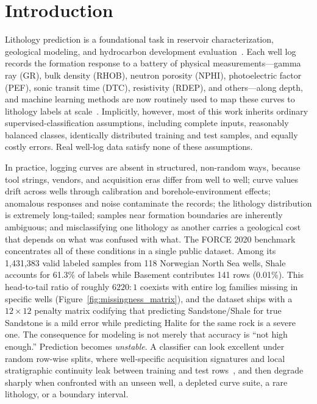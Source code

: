 \documentclass[bdcc,article,submit,pdftex,moreauthors]{Definitions/mdpi}
\begin{document}
\sloppy

\section{Introduction}
\label{sec:intro}
Lithology prediction is a foundational task in reservoir characterization, geological
modeling, and hydrocarbon development evaluation~\cite{rider2011,ellis2007,doveton2014}. Each
well log records the formation response to a battery of physical measurements---gamma ray
(GR), bulk density (RHOB), neutron porosity (NPHI), photoelectric factor (PEF), sonic transit
time (DTC), resistivity (RDEP), and others---along depth, and machine learning methods are
now routinely used to map these curves to lithology labels at
scale~\cite{hall2016facies,merembayev2021,dev2019formation,carvalho2026benchmark}. Implicitly,
however, most of this work inherits ordinary supervised-classification assumptions, including
complete inputs, reasonably balanced classes, identically distributed training and test samples,
and equally costly errors. Real well-log data satisfy none of these
assumptions.

In practice, logging curves are absent in structured, non-random ways, because tool strings,
vendors, and acquisition eras differ from well to well; curve values drift across wells
through calibration and borehole-environment effects; anomalous responses and noise
contaminate the records; the lithology distribution is extremely long-tailed; samples near
formation boundaries are inherently ambiguous; and misclassifying one lithology as another
carries a geological cost that depends on what was confused with what. The FORCE 2020
benchmark~\cite{bormann2020force} concentrates all of these conditions in a single public
dataset. Among its 1{,}431{,}383 valid labeled samples from 118 Norwegian North Sea wells,
Shale accounts for 61.3\% of labels while Basement contributes 141 rows (0.01\%). This
head-to-tail ratio of roughly $6220{:}1$ coexists with entire log families missing in specific wells
(Figure~\ref{fig:missingness_matrix}), and the dataset ships with a
$12{\times}12$ penalty matrix codifying that predicting Sandstone/Shale for true Sandstone
is a mild error while predicting Halite for the same rock is a severe one. The consequence
for modeling is not merely that accuracy is ``not high enough.'' Prediction becomes
\emph{unstable}. A classifier can look excellent under random row-wise splits, where
well-specific acquisition signatures and local stratigraphic continuity leak between training
and test rows~\cite{rosenblatt2024,roberts2017cv,mila2022nndm}, and then degrade sharply
when confronted with an unseen well, a depleted curve suite, a rare lithology, or a boundary
interval.
\end{document}
